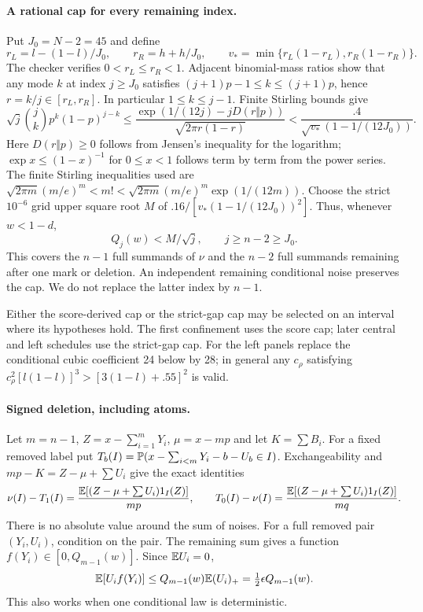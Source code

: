 \paragraph{A rational cap for every remaining index.}
Put $J_0=N-2=45$ and define
\[
 r_L=l-(1-l)/J_0,\qquad r_R=h+h/J_0,\qquad
 v_* =\min\{r_L(1-r_L),r_R(1-r_R)\}.
\]
The checker verifies $0<r_L\le r_R<1$. Adjacent binomial-mass ratios
show that any mode $k$ at index $j\ge J_0$ satisfies
$(j+1)p-1\le k\le(j+1)p$, hence $r=k/j\in[r_L,r_R]$.
In particular $1\le k\le j-1$. Finite Stirling bounds give
\[
 \sqrt j\binom jk p^k(1-p)^{j-k}
 \le\frac{\exp(1/(12j)-jD(r\Vert p))}{\sqrt{2\pi r(1-r)}}
 <\frac{.4}{\sqrt{v_*}(1-1/(12J_0))}.
\]
Here $D(r\Vert p)\ge0$ follows from Jensen's inequality for the logarithm;
$\exp x\le(1-x)^{-1}$ for $0\le x<1$ follows term by term from the
power series. The finite Stirling inequalities used are
$\sqrt{2\pi m}(m/e)^m<m!<\sqrt{2\pi m}(m/e)^m\exp(1/(12m))$.
Choose the strict $10^{-6}$ grid upper square root $M$ of
$.16/[v_*(1-1/(12J_0))^2]$. Thus, whenever $w<1-d$,
\begin{equation}\label{j:local:conf:antichainconcentration}
 Q_j(w)<M/\sqrt j,\qquad j\ge n-2\ge J_0.
\end{equation}
This covers the $n-1$ full summands of $\nu$ and the $n-2$ full summands
remaining after one mark or deletion. An independent remaining conditional
noise preserves the cap. We do not replace the latter index by $n-1$.


Either the score-derived cap or the strict-gap cap may be selected on
an interval where its hypotheses hold. The first confinement uses the
score cap; later central and left schedules use the strict-gap cap.
For the left panels replace the conditional cubic coefficient 24 below
by 28; in general any $c_\rho$ satisfying
$c_\rho^2[l(1-l)]^3>[3(1-l)+.55]^2$ is valid.
\paragraph{Signed deletion, including atoms.}
Let $m=n-1$, $Z=x-\sum_{i=1}^mY_i$, $\mu=x-mp$ and let $K=\sum B_i$.
For a fixed removed label put
$T_b(I)=\mathbb P(x-\sum_{i<m}Y_i-b-U_b\in I)$.
Exchangeability and $mp-K=Z-\mu+\sum U_i$ give the exact identities
\[
 \nu(I)-T_1(I)=\frac{\mathbb E[(Z-\mu+\sum U_i)1_I(Z)]}{mp},\qquad
 T_0(I)-\nu(I)=\frac{\mathbb E[(Z-\mu+\sum U_i)1_I(Z)]}{mq}.
\]
There is no absolute value around the sum of noises.
For a full removed pair $(Y_i,U_i)$, condition on the pair. The remaining
sum gives a function $f(Y_i)\in[0,Q_{m-1}(w)]$. Since $\mathbb E U_i=0$,
\[
 \mathbb E[U_i f(Y_i)]\le Q_{m-1}(w)\mathbb E(U_i)_+
 =\tfrac12\epsilon Q_{m-1}(w).
\]
This also works when one conditional law is deterministic.

